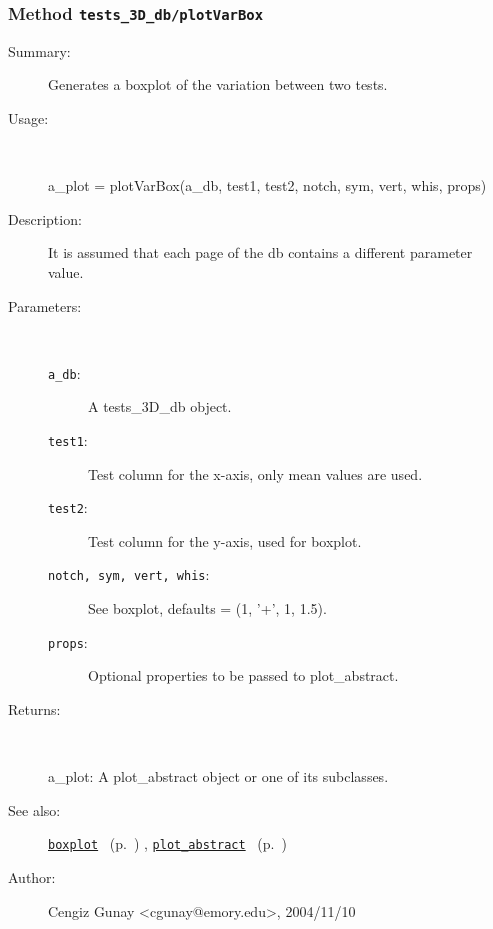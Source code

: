 \subsubsection[Method \texttt{plotVarBox}]{Method \texttt{tests\_3D\_db/plotVarBox}}%
%
\label{ref_tests_3D_db__plotVarBox}%
\hypertarget{ref_tests_3D_db__plotVarBox}{}%
\begin{description}
\item[Summary:]Generates a boxplot of the variation between two tests.
%
\item[Usage:]~%
\begin{lyxcode}%
a\_plot = plotVarBox(a\_db, test1, test2, notch, sym, vert, whis, props)
%
\end{lyxcode}%
%
\item[Description:]%
It is assumed that each page of the db contains a different parameter value.
\item[Parameters:]~
\begin{description}%
\item[\texttt{a\_db}:]
 A tests\_3D\_db object.
\item[\texttt{test1}:]
 Test column for the x-axis, only mean values are used.
\item[\texttt{test2}:]
 Test column for the y-axis, used for boxplot.
\item[\texttt{notch, sym, vert, whis}:]
 See boxplot, defaults = (1, '+', 1, 1.5).
\item[\texttt{props}:]
 Optional properties to be passed to plot\_abstract.
\end{description}%
%
\item[Returns:
]~

	a\_plot: A plot\_abstract object or one of its subclasses.
%
%
\item[See also:]%
\hyperlink{ref_boxplot}{\texttt{boxplot}}%
\ (p.~\pageref{ref_boxplot})%
%
, \hyperlink{ref_plot_abstract}{\texttt{plot\_abstract}}%
\ (p.~\pageref{ref_plot_abstract})%
%
%
\item[Author:]%
Cengiz Gunay <cgunay@emory.edu>, 2004/11/10
%
\end{description}
\methodline%
